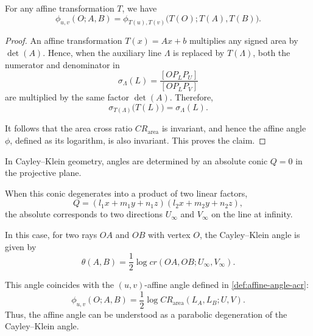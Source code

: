\documentclass[12pt]{article}
\begin{document}
\begin{proposition}
For any affine transformation $T$, we have
\[
\phi_{u,v}(O;A,B)
=
\phi_{T(u),T(v)}\bigl(T(O);T(A),T(B)\bigr).
\]
\end{proposition}

\begin{proof}
An affine transformation $T(x)=Ax+b$ multiplies any signed area by $\det(A)$.
Hence, when the auxiliary line $\Lambda$ is replaced by $T(\Lambda)$,
both the numerator and denominator in
\[
\sigma_\Lambda(L)
=
\frac{[OP_LP_U]}{[OP_LP_V]}
\]
are multiplied by the same factor $\det(A)$.
Therefore,
\[
\sigma_{T(\Lambda)}\bigl(T(L)\bigr)=\sigma_\Lambda(L).
\]

It follows that the area cross ratio $CR_{\mathrm{area}}$ is invariant,
and hence the affine angle $\phi$, defined as its logarithm, is also invariant.
This proves the claim.
\end{proof}

\begin{theorem}
\label{thm:affine-angle-CK-degeneration}

In Cayley--Klein geometry, angles are determined by an absolute conic
$Q=0$ in the projective plane.

When this conic degenerates into a product of two linear factors,
\[
Q=(l_1x+m_1y+n_1z)(l_2x+m_2y+n_2z),
\]
the absolute corresponds to two directions
$U_\infty$ and $V_\infty$ on the line at infinity.

In this case, for two rays $OA$ and $OB$ with vertex $O$,
the Cayley--Klein angle is given by
\[
\theta(A,B)
=
\frac{1}{2}\log cr(OA,OB;U_\infty,V_\infty).
\]
\end{theorem}

\begin{remark}
This angle coincides with the $(u,v)$-affine angle defined in
\cref{def:affine-angle-acr}:
\[
\phi_{u,v}(O;A,B)
=
\frac{1}{2}\log
CR_{\mathrm{area}}(L_A,L_B;U,V).
\]
Thus, the affine angle can be understood as a parabolic degeneration
of the Cayley--Klein angle.
\end{remark}
\end{document}
